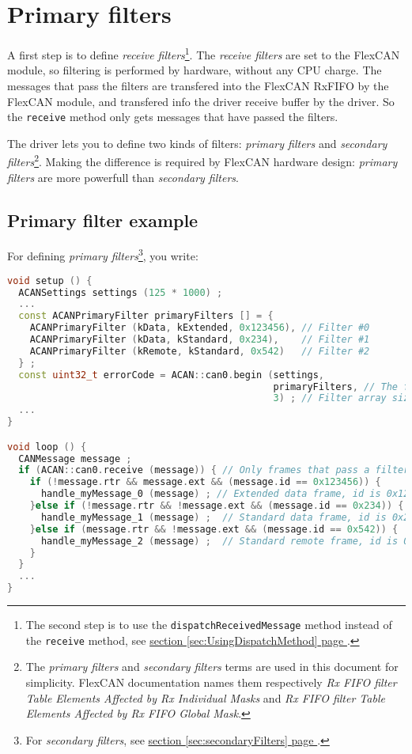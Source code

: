 \documentclass[10pt, a4paper, obeyspaces, openany]{extarticle}
\newcommand \sectionLabel[2]{\section{#1}\label{sec:#2}}
\newcommand\refSectionPage[1]{\hyperref[sec:#1]{section \ref*{sec:#1} page \pageref{sec:#1}}}
\begin{document}
\sectionLabel{Primary filters}{primaryFilters}

A first step is to define \emph{receive filters}\footnote{The second step is to use the \texttt{dispatchReceivedMessage} method instead of the \texttt{receive} method, see \refSectionPage{UsingDispatchMethod}.}. The \emph{receive filters} are set to the FlexCAN module, so filtering is performed by hardware, without any CPU charge. The messages that pass the filters are transfered into the FlexCAN RxFIFO by the FlexCAN module, and transfered info the driver receive buffer by the driver. So the \texttt{receive} method only gets messages that have passed the filters.

The driver lets you to define two kinds of filters: \emph{primary filters} and \emph{secondary filters}\footnote{The \emph{primary filters} and \emph{secondary filters} terms are used in this document for simplicity. FlexCAN documentation names them respectively \emph{Rx FIFO filter Table Elements Affected by Rx Individual Masks} and \emph{Rx FIFO filter Table Elements Affected by Rx FIFO Global Mask}.}. Making the difference is required by FlexCAN hardware design: \emph{primary filters} are more powerfull than \emph{secondary filters}.

\subsection{Primary filter example}

For defining \emph{primary filters}\footnote{For \emph{secondary filters}, see \refSectionPage{secondaryFilters}.}, you write:
{ \small\begin{lstlisting}[language=c++]
void setup () {
  ACANSettings settings (125 * 1000) ;
  ...
  const ACANPrimaryFilter primaryFilters [] = {
    ACANPrimaryFilter (kData, kExtended, 0x123456), // Filter #0
    ACANPrimaryFilter (kData, kStandard, 0x234),    // Filter #1
    ACANPrimaryFilter (kRemote, kStandard, 0x542)   // Filter #2
  } ;
  const uint32_t errorCode = ACAN::can0.begin (settings,
                                               primaryFilters, // The filter array
                                               3) ; // Filter array size
  ...
}

void loop () {
  CANMessage message ;
  if (ACAN::can0.receive (message)) { // Only frames that pass a filter are retrieved
    if (!message.rtr && message.ext && (message.id == 0x123456)) {
      handle_myMessage_0 (message) ; // Extended data frame, id is 0x123456
    }else if (!message.rtr && !message.ext && (message.id == 0x234)) {
      handle_myMessage_1 (message) ;  // Standard data frame, id is 0x234
    }else if (message.rtr && !message.ext && (message.id == 0x542)) {
      handle_myMessage_2 (message) ;  // Standard remote frame, id is 0x542
    }
  }
  ...
}
\end{lstlisting}}
\end{document}
